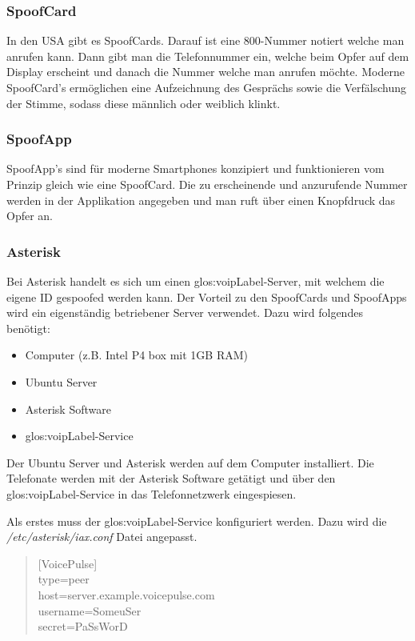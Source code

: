 \subsubsection{SpoofCard}
In den USA gibt es SpoofCards. Darauf ist eine 800-Nummer notiert welche man anrufen kann. Dann gibt man die Telefonnummer ein, welche beim Opfer auf dem Display erscheint und danach die Nummer welche man anrufen möchte. Moderne SpoofCard's ermöglichen eine Aufzeichnung des Gesprächs sowie die Verfälschung der Stimme, sodass diese männlich oder weiblich klinkt.

\subsubsection{SpoofApp}
SpoofApp's sind für moderne Smartphones konzipiert und funktionieren vom Prinzip gleich wie eine SpoofCard. Die zu erscheinende und anzurufende Nummer werden in der Applikation angegeben und man ruft über einen Knopfdruck das Opfer an.

\subsubsection{Asterisk} 
Bei Asterisk handelt es sich um einen \gls{glos:voipLabel}-Server, mit welchem die eigene ID gespoofed werden kann. Der Vorteil zu den SpoofCards und SpoofApps wird ein eigenständig betriebener Server verwendet. Dazu wird folgendes benötigt:
\begin{itemize}
\item Computer (z.B. Intel P4 box mit 1GB RAM)
\item Ubuntu Server
\item Asterisk Software
\item \gls{glos:voipLabel}-Service
\end{itemize}

Der Ubuntu Server und Asterisk werden auf dem Computer installiert. Die Telefonate werden mit der Asterisk Software getätigt und über den \gls{glos:voipLabel}-Service in das Telefonnetzwerk eingespiesen.

Als erstes muss der \gls{glos:voipLabel}-Service konfiguriert werden. Dazu wird die \textit{/etc/asterisk/iax.conf} Datei angepasst. 
\begin{quote}
[VoicePulse]\\
type=peer\\
host=server.example.voicepulse.com\\
username=SomeuSer\\
secret=PaSsWorD\\
\end{quote} 

